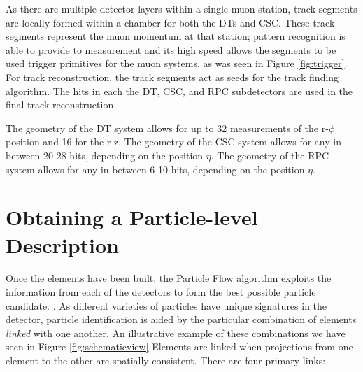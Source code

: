 As there are multiple detector layers within a single muon station, track segments are locally formed within a chamber for both the DTs and CSC. These track segments represent the muon momentum at that station; pattern recognition is able to provide to measurement and its high speed allows the segments to be used trigger primitives for the muon systems, as was seen in Figure \ref{fig:trigger}. For track reconstruction, the track segments act as seeds for the track finding algorithm. The hits in each the DT, CSC, and RPC subdetectors are used in the final track reconstruction.

The geometry of the DT system allows for up to 32 measurements of the r-$\phi$ position and 16 for the r-z. The geometry of the CSC system allows for any in between 20-28 hits, depending on the position $\eta$. The geometry of the RPC system allows for any in between 6-10 hits, depending on the position $\eta$. 

\section{Obtaining a Particle-level Description}

Once the elements have been built, the Particle Flow algorithm exploits the information from each of the detectors to form the best possible particle candidate. \cite{CMS-PRF-14-001}. As different varieties of particles have unique signatures in the detector, particle identification is aided by the particular combination of elements \textit{linked} with one another. An illustrative example of these combinations we have seen in Figure \ref{fig:schematicview}  Elements are linked when projections from one element to the other are spatially consistent. There are four primary links:

